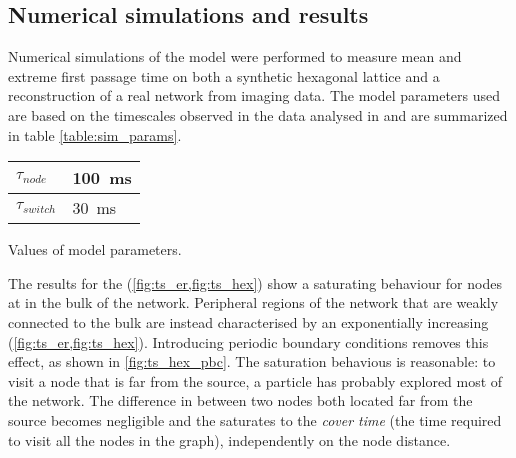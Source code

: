 \subsection{Numerical simulations and results}

Numerical simulations of the model were performed to measure mean and extreme first passage time on both a synthetic hexagonal lattice and a reconstruction of a real network from  imaging data. The model parameters used are based on the timescales observed in the  data analysed in  and are summarized in table \ref{table:sim_params}.

\begin{margintable}
  \sffamily
  \begin{tabular}{@{}ll@{}}
    $\tau_{node}$   & \SI{100}{\milli\second}  \\
    \hline
    $\tau_{switch}$ & \SI{30}{\milli\second}  \\
    \hline
  \end{tabular}
  \caption{Values of model parameters.}\label{table:sim_params}
\end{margintable}

The results for the  (\cref{fig:ts_er,fig:ts_hex}) show a saturating behaviour for nodes at in the bulk of the network. Peripheral regions of the network that are weakly connected to the bulk are instead characterised by an exponentially increasing  (\cref{fig:ts_er,fig:ts_hex}). Introducing periodic boundary conditions removes this effect, as shown in \cref{fig:ts_hex_pbc}. The saturation behavious is reasonable: to visit a node that is far from the source, a particle has probably explored most of the network. The difference in  between two nodes both located far from the source becomes negligible and the  saturates to the \emph{cover time} (the time required to visit all the nodes in the graph), independently on the node distance.

